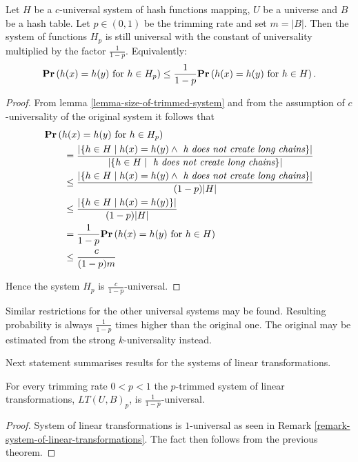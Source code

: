 \begin{theorem}
\label{theorem-p-trimmed-is-universal}
Let $H$ be a $c$-universal system of hash functions mapping, $U$ be a universe and $B$ be a hash table. Let $p \in (0, 1)$ be the trimming rate and set $m = |B|$. Then the system of functions $H_p$ is still universal with the constant of universality multiplied by the factor $\frac{1}{1 - p}$. Equivalently:
\[
	\mathbf{Pr}\left(h(x) = h(y) \text{ for } h \in H_p\right) \leq \frac{1}{1 - p} \mathbf{Pr}\left(h(x) = h(y) \text{ for } h \in H\right) \text{.}
\]
\end{theorem}
\begin{proof}
From lemma \ref{lemma-size-of-trimmed-system} and from the assumption of $c$-universality of the original system it follows that 
\[
\begin{split}
& \mathbf{Pr}\left(h(x) = h(y) \text{ for } h \in H_p\right)  \\
	& \qquad =  \frac{|\{ h \in H \mid h(x) = h(y) \wedge \textit{ h does not create long chains} \}|}{|\lbrace h \in H \mid \textit{ h does not create long chains} \rbrace|} \\
	& \qquad \leq \frac{|\{ h \in H \mid h(x) = h(y) \wedge \textit{ h does not create long chains} \}|}{(1 - p)|H|} \\ 
	& \qquad \leq \frac{|\{ h \in H \mid h(x) = h(y) \}|}{(1 - p)|H|} \\
	& \qquad = \frac{1}{1 - p} \mathbf{Pr}\left(h(x) = h(y) \text{ for } h \in H\right) \\
	& \qquad \leq \frac{c}{(1 - p) m} \\
\end{split}
\]

Hence the system $H_p$ is $\frac{c}{1 - p}$-universal.
\end{proof}

Similar restrictions for the other universal systems may be found. Resulting probability is always $\frac{1}{1 - p}$ times higher than the original one. The original may be estimated from the strong $k$-universality instead.

Next statement summarises results for the systems of linear transformations.

\begin{corollary}
\label{corollary-trimming-linear}
For every trimming rate $0 < p < 1$ the $p$-trimmed system of linear transformations, $LT(U, B)_p$, is $\frac{1}{1 - p}$-universal.
\end{corollary}
\begin{proof}
System of linear transformations is $1$-universal as seen in Remark \ref{remark-system-of-linear-transformations}. The fact then follows from the previous theorem.
\end{proof}


